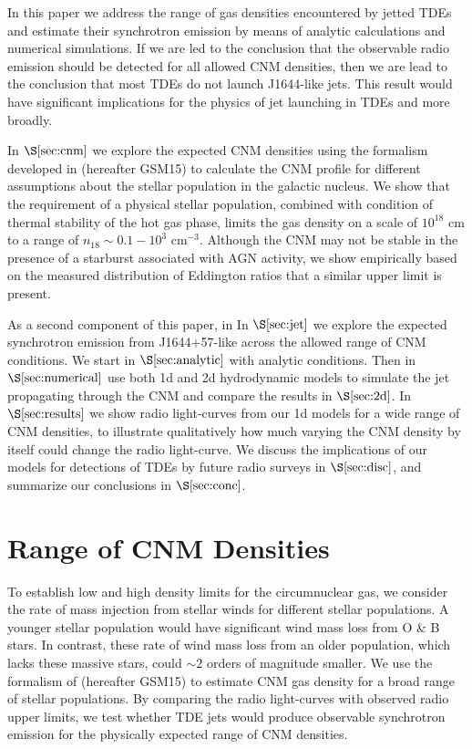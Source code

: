 \documentclass[usenatbib,fleqn]{mnras}
\begin{document}
In this paper we address the range of gas densities encountered by jetted TDEs and estimate their synchrotron emission by means of analytic calculations and numerical simulations.   If we are led to the conclusion that the observable radio emission should be detected for all allowed CNM densities, then we are lead to the conclusion that most TDEs do not launch J1644-like jets.  This result would have significant implications for the physics of jet launching in TDEs and more broadly.  

In $\S\ref{sec:cnm}$ we explore the expected CNM densities using the formalism developed in \citet{Generozov+2015} (hereafter GSM15) to calculate the CNM profile for different assumptions about the stellar population in the galactic nucleus.  We show that the requirement of a physical stellar population, combined with condition of thermal stability of the hot gas phase, limits the gas density on a scale of $10^{18}$ cm to a range of $n_{18} \sim 0.1-10^{3}$ cm$^{-3}$.  Although the CNM may not be stable in the presence of a starburst associated with AGN activity, we show empirically based on the measured distribution of Eddington ratios that a similar upper limit is present.  

As a second component of this paper, in In $\S\ref{sec:jet}$ we explore the expected synchrotron emission from J1644+57-like across the allowed range of CNM conditions.  We start in $\S\ref{sec:analytic}$ with analytic conditions.  Then in $\S\ref{sec:numerical}$ use both 1d and 2d hydrodynamic models to simulate the jet propagating through the CNM and compare the results in $\S\ref{sec:2d}$. In $\S\ref{sec:results}$ we show radio light-curves from our 1d models for a wide range of CNM densities, to illustrate qualitatively how much varying the CNM density by itself
could change the radio light-curve.  We discuss the implications of our models for detections of TDEs by future radio surveys in
$\S\ref{sec:disc}$, and summarize our conclusions in $\S\ref{sec:conc}$.

\section{Range of CNM Densities}
\label{sec:cnm}


To establish low and high density limits for the circumnuclear gas, we
consider the rate of mass injection from stellar winds for different
stellar populations. A younger stellar population would have
significant wind mass loss from O \& B stars. In contrast, these rate
of wind mass loss from an older population, which lacks these massive
stars, could $\sim 2$ orders of magnitude smaller. We use the
formalism of \citet{Generozov+2015} (hereafter GSM15) to estimate CNM
gas density for a broad range of stellar populations. By comparing the
radio light-curves with observed radio upper limits, we test whether
TDE jets would produce observable synchrotron emission for the
physically expected range of CNM densities.
\end{document}
